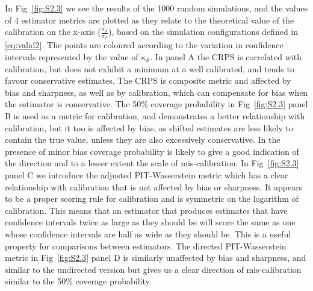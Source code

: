 \documentclass[a4paper, 12pt, twoside]{article}
\begin{document}
In Fig~\ref{fig:S2.3} we see the results of the 1000 random simulations, and the values of 4 estimator metrics are plotted as they relate to the theoretical value of the calibration on the x-axis ($\frac{\sigma_\mathcal{S}}{\sigma_\mathcal{E}}$), based on the simulation configurations defined in \eqref{eq:valid2}. The points are coloured according to the variation in confidence intervals represented by the value of $\kappa_\mathcal{S}$. In panel A the CRPS is correlated with calibration, but does not exhibit a minimum at a well calibrated, and tends to favour conservative estimates. The CRPS is composite metric and affected by bias and sharpness, as well as by calibration, which can compensate for bias when the estimator is conservative. The 50\% coverage probability in Fig~\ref{fig:S2.3} panel B is used as a metric for calibration, and demonstrates a better relationship with calibration, but it too is affected by bias, as shifted estimates are less likely to contain the true value, unless they are also excessively conservative. In the presence of minor bias coverage probability is likely to give a good indication of the direction and to a lesser extent the scale of mis-calibration. In Fig~\ref{fig:S2.3} panel C we introduce the adjusted PIT-Wasserstein metric which has a clear relationship with calibration that is not affected by bias or sharpness. It appears to be a proper scoring rule for calibration and is symmetric on the logarithm of calibration. This means that an estimator that produces estimates that have confidence intervals twice as large as they should be will score the same as one whose confidence intervals are half as wide as they should be. This is a useful property for comparisons between estimators. The directed PIT-Wasserstein metric in Fig~\ref{fig:S2.3} panel D is similarly unaffected by bias and sharpness, and similar to the undirected version but gives us a clear direction of mis-calibration similar to the 50\% coverage probability.
\end{document}
